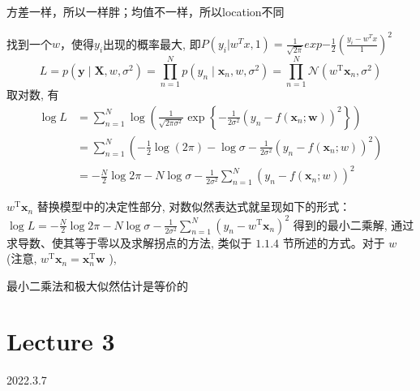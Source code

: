\documentclass[UTF8]{ctexart}
\begin{document}
方差一样，所以一样胖；均值不一样，所以location不同

找到一个$w$，使得$y_i$出现的概率最大, 即$P(y_i|w^Tx,1)=\frac{1}{\sqrt{2\pi}}exp{-\frac{1}{2}(\frac{y_i-w^Tx}{1})^2}$
\begin{equation*}
    L=p\left(\boldsymbol{y} \mid \boldsymbol{X}, w, \sigma^{2}\right)=\prod_{n=1}^{N} p\left(y_{n} \mid \boldsymbol{x}_{n}, w, \sigma^{2}\right)=\prod_{n=1}^{N} \mathcal{N}\left(w^{\mathrm{T}} \boldsymbol{x}_{n}, \sigma^{2}\right)
\end{equation*}
取对数, 有 
\begin{equation*}
    \begin{aligned}
        \log L &=\sum_{n=1}^{N} \log \left(\frac{1}{\sqrt{2 \pi \sigma^{2}}} \exp \left\{-\frac{1}{2 \sigma^{2}}\left(y_{n}-f\left(\boldsymbol{x}_{n} ; \boldsymbol{w}\right)\right)^{2}\right\}\right) \\
        &=\sum_{n=1}^{N}\left(-\frac{1}{2} \log (2 \pi)-\log \sigma-\frac{1}{2 \sigma^{2}}\left(y_{n}-f\left(\boldsymbol{x}_{n} ; w\right)\right)^{2}\right) \\
        &=-\frac{N}{2} \log 2 \pi-N \log \sigma-\frac{1}{2 \sigma^{2}} \sum_{n=1}^{N}\left(y_{n}-f\left(\boldsymbol{x}_{n} ; w\right)\right)^{2}
    \end{aligned}
\end{equation*}

$w^{\mathrm{T}} \boldsymbol{x}_{n}$ 替换模型中的决定性部分, 对数似然表达式就呈现如下的形式： $\log L=-\frac{N}{2} \log 2 \pi-N \log \sigma-\frac{1}{2 \sigma^{2}} \sum_{n=1}^{N}\left(y_{n}-w^{\mathrm{T}} \boldsymbol{x}_{n}\right)^{2}$
得到的最小二乘解, 通过求导数、使其等于零以及求解拐点的方法, 类似于 $1.1 .4$ 节所述的方式。对于 $w$ (注意, $w^{\mathrm{T}} \boldsymbol{x}_{n}=\boldsymbol{x}_{n}^{\mathrm{T}} \boldsymbol{w}$ ),

最小二乘法和极大似然估计是等价的
\newpage

\section{Lecture 3}
2022.3.7
\end{document}
